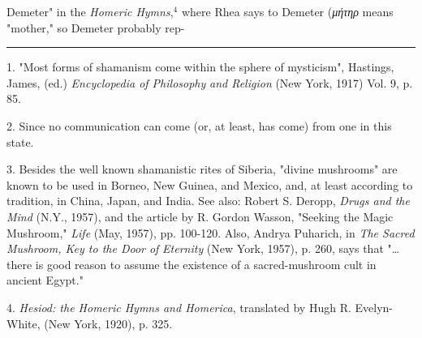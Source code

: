Demeter" in the \textit{Homeric Hymns},$^{4}$ where Rhea says to Demeter
(\textit{μήτηρ} means "mother," so Demeter probably rep-\linebreak
\null\par
\vspace*{-\baselineskip}
\vspace*{\fill}
\noindent\rule{0.25\textwidth}{0.4pt}\par
1. "Most forms of shamanism come within the sphere of
mysticism", Hastings, James, (ed.) \textit{Encyclopedia of Philosophy}
\textit{and Religion} (New York, 1917) Vol. 9, p. 85.\par
2. Since no communication can come (or, at least, has come)
from one in this state.\par
3. Besides the well known shamanistic rites of Siberia,
"divine mushrooms" are known to be used in Borneo, New Guinea,
and Mexico, and, at least according to tradition, in China,
Japan, and India. See also: Robert S. Deropp, \textit{Drugs and the}
\textit{Mind} (N.Y., 1957), and the article by R. Gordon Wasson, "Seeking
the Magic Mushroom," \textit{Life} (May, 1957), pp. 100-120. Also,
Andrya Puharich, in \textit{The Sacred Mushroom, Key to the Door of}
\textit{Eternity} (New York, 1957), p. 260, says that "\dots there is good
reason to assume the existence of a sacred-mushroom cult in
ancient Egypt."\par
4. \textit{Hesiod: the Homeric Hymns and Homerica}, translated by
Hugh R. Evelyn-White, (New York, 1920), p. 325.\par

\newpage


{}

